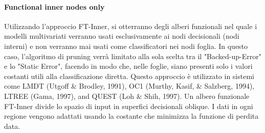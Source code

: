 \paragraph{Functional inner nodes only}
Utilizzando l'approccio FT-Inner, si otterranno degli alberi funzionali nel quale i modelli multivariati verranno usati esclusivamente ai nodi decisionali (nodi interni) e non verranno mai usati come classificatori nei nodi foglia. In questo caso, l'algoritmo di pruning verrà limitato alla sola scelta tra il "Backed-up-Error" e lo "Static Error", facendo in modo che, nelle foglie, siano presenti solo i valori costanti utili alla classificazione diretta. Questo approccio è utilizzato in sistemi come LMDT (Utgoff \& Brodley, 1991), OC1 (Murthy, Kasif, \& Salzberg, 1994), LTREE (Gama, 1997), and QUEST (Loh \& Shih, 1997). Un albero funzionale FT-Inner divide lo spazio di input in superfici decisionali oblique. I dati in ogni regione vengono adattati usando la costante che minimizza la funzione di perdita data.


